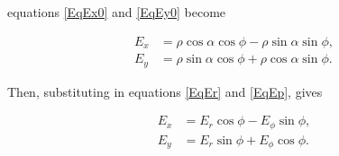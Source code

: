 \documentclass[]{article}
\begin{document}
	equations \ref{EqEx0} and \ref{EqEy0} become 
	
	\begin{align}
		E_x &= \rho\cos\alpha\cos\phi - \rho\sin\alpha\sin\phi, \\
		E_y &= \rho\sin\alpha\cos\phi + \rho\cos\alpha\sin\phi.
	\end{align}
	
	Then, substituting in equations \ref{EqEr} and \ref{EqEp}, gives
	
	\begin{align}
		E_x &= E_r\cos\phi - E_\phi\sin\phi, \\
		E_y &= E_r\sin\phi + E_\phi\cos\phi.
	\end{align}



\end{document}
